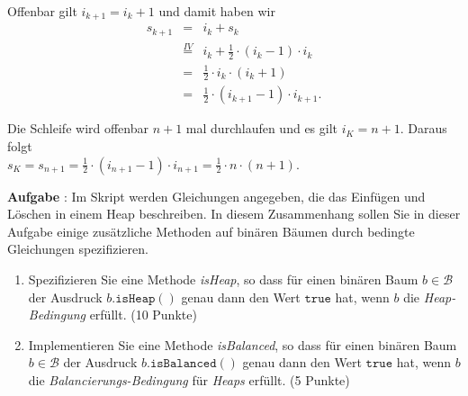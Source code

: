 \documentclass{article}
\newcounter{aufgabe}
\newcommand{\exercise}{\vspace*{0.2cm}
\stepcounter{aufgabe}

\noindent
\textbf{Aufgabe \arabic{aufgabe}}: }
\begin{document}
\begin{enumerate}
\begin{enumerate}
            Offenbar gilt $i_{k+1} = i_k + 1$ und damit haben wir 
            \begin{eqnarray*}
              s_{k+1} & = & i_k + s_k \\
            & \stackrel{IV}{=} & i_k + \frac{1}{2} \cdot (i_{k}-1) \cdot i_k \\
            & = & \frac{1}{2} \cdot i_{k} \cdot (i_k + 1) \\
            & = & \frac{1}{2} \cdot (i_{k+1} - 1) \cdot i_{k+1}.
            \end{eqnarray*}
      \end{enumerate}
      Die Schleife wird offenbar $n+1$ mal durchlaufen und es gilt $i_K = n+1$.  Daraus folgt
      \\[0.2cm]
      \hspace*{1.3cm}
      $s_K = s_{n+1} = \frac{1}{2} \cdot (i_{n+1} - 1) \cdot i_{n+1} = \frac{1}{2} \cdot n \cdot (n+1)$.
\end{enumerate}
\vspace{0.3cm}
\pagebreak

\exercise
Im Skript
werden Gleichungen angegeben, die das Einf\"ugen und L\"oschen in einem Heap beschreiben.
In diesem Zusammenhang sollen Sie in dieser Aufgabe  einige zus\"atzliche Methoden auf
bin\"aren B\"aumen durch bedingte Gleichungen spezifizieren.
\begin{enumerate}
\item Spezifizieren Sie eine Methode \textsl{isHeap}, so
      dass f\"ur einen bin\"aren Baum $b \in \mathcal{B}$ der Ausdruck 
      $b.\mathtt{isHeap}()$ genau dann den Wert $\mathtt{true}$ hat, wenn $b$ die
      \emph{Heap-Bedingung} erf\"ullt.  \hspace*{\fill} (10 Punkte)
\item Implementieren Sie eine Methode \textsl{isBalanced}, so
      dass f\"ur einen bin\"aren Baum $b \in \mathcal{B}$ der Ausdruck 
      $b.\mathtt{isBalanced}()$ genau dann den Wert $\mathtt{true}$ hat, wenn $b$ die
      \emph{Balancierungs-Bedingung} f\"ur \emph{Heaps} erf\"ullt.  
      \hspace*{\fill} (5 Punkte)
\end{enumerate}
\vspace{0.3cm}
\end{document}
